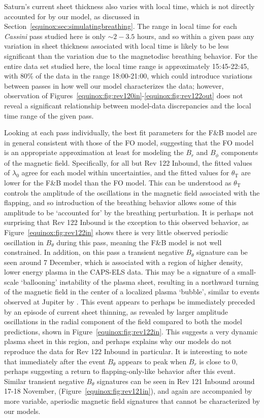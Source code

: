 Saturn's current sheet thickness also varies with local time, which is not directly accounted for by our model, as discussed in Section~\ref{equinox:sec:simulatingbreathing}. The range in local time for each \textit{Cassini} pass studied here is only $\sim2-3.5$ hours, and so within a given pass any variation in sheet thickness associated with local time is likely to be less significant than the variation due to the magnetodisc breathing behavior. For the entire data set studied here, the local time range is approximately 15:45-22:45, with 80\% of the data in the range 18:00-21:00, which could introduce variations between passes in how well our model characterizes the data; however, observation of Figures~\ref{equinox:fig:rev120in}-\ref{equinox:fig:rev122out} does not reveal a significant relationship between model-data discrepancies and the local time range of the given pass.

Looking at each pass individually, the best fit parameters for the F{\&}B model are in general consistent with those of the FO model, suggesting that the FO model is an appropriate approximation at least for modeling the $B_{r}$ and $B_{\phi}$ components of the magnetic field. Specifically, for all but Rev 122 Inbound, the fitted values of $\lambda_0$ agree for each model within uncertainties, and the fitted values for $\theta_\mathrm{T}$ are lower for the F{\&}B model than the FO model. This can be understood as $\theta_\mathrm{T}$ controls the amplitude of the oscillations in the magnetic field associated with the flapping, and so introduction of the breathing behavior allows some of this amplitude to be `accounted for' by the breathing perturbation. It is perhaps not surprising that Rev 122 Inbound is the exception to this observed behavior, as Figure~\ref{equinox:fig:rev122in} shows there is very little observed periodic oscillation in $B_{\theta}$ during this pass, meaning the F{\&}B model is not well constrained. In addition, on this pass a transient negative $B_{\theta}$ signature can be seen around 7 December, which is associated with a region of higher density, lower energy plasma in the CAPS-ELS data. This may be a signature of a small-scale `ballooning' instability of the plasma sheet, resulting in a northward turning of the magnetic field in the center of a localized plasma `bubble', similar to events observed at Jupiter by {\citet{kivelson2005}. This event appears to perhaps be immediately preceded by an episode of current sheet thinning, as revealed by larger amplitude oscillations in the radial component of the field compared to both the model predictions, shown in Figure~\ref{equinox:fig:rev122in}.} This suggests a very dynamic plasma sheet in this region, and perhaps explains why our models do not reproduce the data for Rev 122 Inbound in particular. It is interesting to note that immediately after the event $B_\theta$ appears to peak when $B_r$ is close to 0, perhaps suggesting a return to flapping-only-like behavior after this event. Similar transient negative $B_\theta$ signatures can be seen in Rev 121 Inbound around 17{\--}18 November, (Figure~\ref{equinox:fig:rev121in}), and again are accompanied by more variable, aperiodic magnetic field signatures that cannot be characterized by our models.

